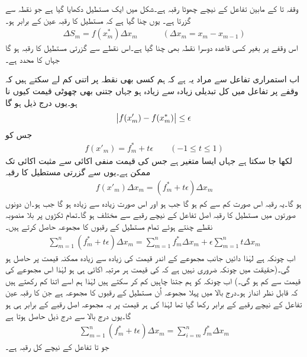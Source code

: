 وقفہ  تا  کے مابین تفاعل کے نیچے  چھوٹا رقبہ  ہے۔شکل  میں ایک مستطیل دکھایا گیا ہے جو نقطہ  سے گزرتا ہے۔ یوں چنا گیا ہے کہ مستطیل کا رقبہ عین   کے برابر ہو۔
\begin{align*}
\Delta S_m=f(x^*_{m})\Delta x_m\quad \quad  \quad (\Delta x_m=x_{m}-x_{m-1})
\end{align*}
 اس وقفے پر بغیر کسی قاعدہ دوسرا نقطہ  بھی چنا گیا ہے۔اس نقطے سے گزرتی مستطیل کا رقبہ  ہو گا جہاں  کا  محدد  ہے۔


اب استمراری تفاعل سے مراد یہ ہے کہ ہم کسی بھی  نقطہ  پر    اتنی کم لے سکتے ہیں کہ  وقفے پر تفاعل میں کل تبدیلی زیادہ سے زیادہ   ہو جہاں  جتنی بھی  چھوٹی قیمت کیوں نا ہو۔یوں  درج ذیل ہو گا
\begin{align*}
\abs{f(x'_m)-f(x^*_m)}\le \epsilon
\end{align*}
جس کو 
\begin{align*}
f(x'_m)=f^*_m+t\epsilon \quad \quad (-1\le t \le 1)
\end{align*}
لکھا جا سکتا ہے جہاں  ایسا متغیر ہے جس کی قیمت منفی اکائی سے مثبت اکائی تک ممکن ہے۔یوں  سے گزرتی مستطیل کا رقبہ
\begin{align*}
f(x'_m)\Delta x_m=(f^*_m+t\epsilon)\Delta x_m
\end{align*}
ہو گا۔یہ رقبہ اس صورت کم سے کم ہو گا جب  ہو اور اس صورت زیادہ سے زیادہ ہو گا جب  ہو۔ان دونوں صورتوں میں مستطیل کا رقبہ اصل تفاعل کے نیچے  رقبے سے  مختلف ہو گا۔تمام ٹکڑوں پر بلا منصوبہ نقطے چنتے ہوئے تمام  مستطیل کے رقبوں کا مجموعہ حاصل کرتے ہیں۔
\begin{align*}
\sum_{m=1}^{n}(f^*_m+t\epsilon)\Delta x_m=\sum_{m=1}^{n} f^*_m\Delta x_m+\epsilon\sum_{m=1}^{n}  t\Delta x_m
\end{align*}
اب چونکہ  ہے لہٰذا دائیں جانب مجموعے کے اندر قیمت کی زیادہ سے زیادہ ممکنہ قیمت  پر  حاصل ہو گی۔(حقیقت میں چونکہ ضروری نہیں ہے کہ  کی قیمت ہر مرتبہ اکائی ہی ہو لہٰذا اس مجموعے کی قیمت  سے کم ہو گی۔) اب چونکہ  کو ہم جتنا چاہیں کم کر سکتے ہیں لہٰذا ہم اسے اتنا کم رکھتے ہیں کہ  قابل نظر انداز ہو۔درج بالا میں پہلا مجموعہ اُن مستطیل کے رقبوں کا مجموعہ ہے جن کا رقبہ عین تفاعل کے نیچے رقبے  کے برابر رکھا گیا تھا لہٰذا  کی ہر قیمت پر یہ مجموعہ اصل رقبے کے برابر ہی ہو گا۔یوں درج بالا سے درج ذیل حاصل ہوتا ہے
\begin{align*}
\sum_{m=1}^{n}(f^*_m+t\epsilon)\Delta x_m=\sum_{i=m}^{n} f^*_m\Delta x_m
\end{align*}
جو  تا  تفاعل کے نیچے کل رقبہ ہے۔

